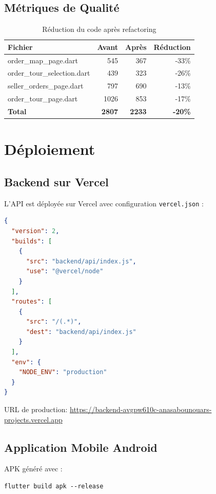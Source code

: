 \documentclass[12pt,a4paper]{report}
\begin{document}
\subsection{Métriques de Qualité}

\begin{table}[H]
\centering
\begin{tabular}{|l|r|r|r|}
\hline
\textbf{Fichier} & \textbf{Avant} & \textbf{Après} & \textbf{Réduction} \\
\hline
order\_map\_page.dart & 545 & 367 & -33\% \\
order\_tour\_selection.dart & 439 & 323 & -26\% \\
seller\_orders\_page.dart & 797 & 690 & -13\% \\
order\_tour\_page.dart & 1026 & 853 & -17\% \\
\hline
\textbf{Total} & \textbf{2807} & \textbf{2233} & \textbf{-20\%} \\
\hline
\end{tabular}
\caption{Réduction du code après refactoring}
\end{table}

\section{Déploiement}

\subsection{Backend sur Vercel}

L'API est déployée sur Vercel avec configuration \texttt{vercel.json} :

\begin{lstlisting}[language=JSON, caption=Configuration Vercel]
{
  "version": 2,
  "builds": [
    {
      "src": "backend/api/index.js",
      "use": "@vercel/node"
    }
  ],
  "routes": [
    {
      "src": "/(.*)",
      "dest": "backend/api/index.js"
    }
  ],
  "env": {
    "NODE_ENV": "production"
  }
}
\end{lstlisting}

URL de production: \url{https://backend-avgpw610c-anasabounouars-projects.vercel.app}

\subsection{Application Mobile Android}

APK généré avec :
\begin{verbatim}
flutter build apk --release
\end{verbatim}
\end{document}
